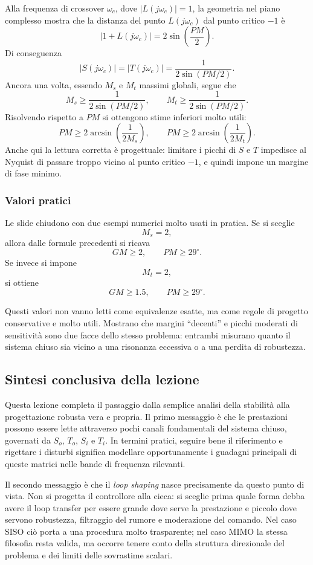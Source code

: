 \documentclass[11pt,a4paper]{article}
\begin{document}
Alla frequenza di crossover $\omega_c$, dove $|L(j\omega_c)|=1$, la geometria nel piano complesso mostra che la distanza del punto $L(j\omega_c)$ dal punto critico $-1$ è
$$
|1+L(j\omega_c)| = 2\sin\!\left(\frac{PM}{2}\right).
$$
Di conseguenza
$$
|S(j\omega_c)|
=
|T(j\omega_c)|
=
\frac{1}{2\sin(PM/2)}.
$$
Ancora una volta, essendo $M_s$ e $M_t$ massimi globali, segue che
$$
M_s \ge \frac{1}{2\sin(PM/2)},
\qquad
M_t \ge \frac{1}{2\sin(PM/2)}.
$$
Risolvendo rispetto a $PM$ si ottengono stime inferiori molto utili:
$$
PM \ge 2\arcsin\!\left(\frac{1}{2M_s}\right),
\qquad
PM \ge 2\arcsin\!\left(\frac{1}{2M_t}\right).
$$
Anche qui la lettura corretta è progettuale: limitare i picchi di $S$ e $T$ impedisce al Nyquist di passare troppo vicino al punto critico $-1$, e quindi impone un margine di fase minimo.

\subsubsection{Valori pratici}

Le slide chiudono con due esempi numerici molto usati in pratica. Se si sceglie
$$
M_s = 2,
$$
allora dalle formule precedenti si ricava
$$
GM \ge 2,
\qquad
PM \ge 29^\circ.
$$
Se invece si impone
$$
M_t = 2,
$$
si ottiene
$$
GM \ge 1.5,
\qquad
PM \ge 29^\circ.
$$

Questi valori non vanno letti come equivalenze esatte, ma come regole di progetto conservative e molto utili. Mostrano che margini ``decenti'' e picchi moderati di sensitività sono due facce dello stesso problema: entrambi misurano quanto il sistema chiuso sia vicino a una risonanza eccessiva o a una perdita di robustezza.

\subsection{Sintesi conclusiva della lezione}

Questa lezione completa il passaggio dalla semplice analisi della stabilità alla progettazione robusta vera e propria. Il primo messaggio è che le prestazioni possono essere lette attraverso pochi canali fondamentali del sistema chiuso, governati da $S_o$, $T_o$, $S_i$ e $T_i$. In termini pratici, seguire bene il riferimento e rigettare i disturbi significa modellare opportunamente i guadagni principali di queste matrici nelle bande di frequenza rilevanti.

Il secondo messaggio è che il \emph{loop shaping} nasce precisamente da questo punto di vista. Non si progetta il controllore alla cieca: si sceglie prima quale forma debba avere il loop transfer per essere grande dove serve la prestazione e piccolo dove servono robustezza, filtraggio del rumore e moderazione del comando. Nel caso SISO ciò porta a una procedura molto trasparente; nel caso MIMO la stessa filosofia resta valida, ma occorre tenere conto della struttura direzionale del problema e dei limiti delle sovrastime scalari.
\end{document}
